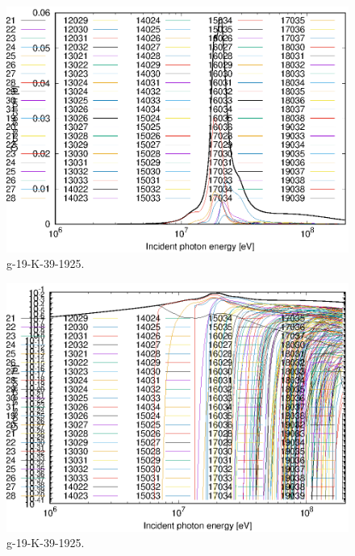 \begin{figure}
 \includegraphics[width=\linewidth]{eps/g_19-K-39_1925.eps}
  \caption{g-19-K-39-1925.}
\end{figure}
\begin{figure}
 \includegraphics[width=\linewidth]{eps-log/g_19-K-39_1925.eps}
 \caption{g-19-K-39-1925.}
\end{figure}
\newpage \clearpage

